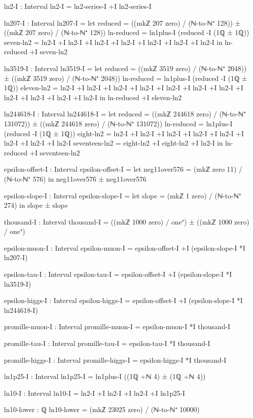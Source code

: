 \documentclass[11pt,a4paper]{book}
\begin{document}
\begin{code}
ln2-I : Interval
ln2-I = ln2-series-I +I ln2-series-I

ln207-I : Interval
ln207-I = 
  let reduced = ((mkℤ 207 zero) / (ℕ-to-ℕ⁺ 128)) ± ((mkℤ 207 zero) / (ℕ-to-ℕ⁺ 128))
      ln-reduced = ln1plus-I (reduced -I (1ℚ ± 1ℚ))
      seven-ln2 = ln2-I +I ln2-I +I ln2-I +I ln2-I +I ln2-I +I ln2-I +I ln2-I
  in ln-reduced +I seven-ln2

ln3519-I : Interval
ln3519-I = 
  let reduced = ((mkℤ 3519 zero) / (ℕ-to-ℕ⁺ 2048)) ± ((mkℤ 3519 zero) / (ℕ-to-ℕ⁺ 2048))
      ln-reduced = ln1plus-I (reduced -I (1ℚ ± 1ℚ))
      eleven-ln2 = ln2-I +I ln2-I +I ln2-I +I ln2-I +I ln2-I +I ln2-I +I ln2-I +I ln2-I +I ln2-I +I ln2-I +I ln2-I
  in ln-reduced +I eleven-ln2

ln244618-I : Interval
ln244618-I = 
  let reduced = ((mkℤ 244618 zero) / (ℕ-to-ℕ⁺ 131072)) ± ((mkℤ 244618 zero) / (ℕ-to-ℕ⁺ 131072))
      ln-reduced = ln1plus-I (reduced -I (1ℚ ± 1ℚ))
      eight-ln2 = ln2-I +I ln2-I +I ln2-I +I ln2-I +I ln2-I +I ln2-I +I ln2-I +I ln2-I
      seventeen-ln2 = eight-ln2 +I eight-ln2 +I ln2-I
  in ln-reduced +I seventeen-ln2

epsilon-offset-I : Interval
epsilon-offset-I = 
  let neg11over576 = (mkℤ zero 11) / (ℕ-to-ℕ⁺ 576)
  in neg11over576 ± neg11over576

epsilon-slope-I : Interval  
epsilon-slope-I = 
  let slope = (mkℤ 1 zero) / (ℕ-to-ℕ⁺ 274)
  in slope ± slope

thousand-I : Interval
thousand-I = ((mkℤ 1000 zero) / one⁺) ± ((mkℤ 1000 zero) / one⁺)

epsilon-muon-I : Interval
epsilon-muon-I = epsilon-offset-I +I (epsilon-slope-I *I ln207-I)

epsilon-tau-I : Interval
epsilon-tau-I = epsilon-offset-I +I (epsilon-slope-I *I ln3519-I)

epsilon-higgs-I : Interval
epsilon-higgs-I = epsilon-offset-I +I (epsilon-slope-I *I ln244618-I)

promille-muon-I : Interval
promille-muon-I = epsilon-muon-I *I thousand-I

promille-tau-I : Interval
promille-tau-I = epsilon-tau-I *I thousand-I

promille-higgs-I : Interval
promille-higgs-I = epsilon-higgs-I *I thousand-I

ln1p25-I : Interval
ln1p25-I = ln1plus-I ((1ℚ ÷ℕ 4) ± (1ℚ ÷ℕ 4))

ln10-I : Interval
ln10-I = ln2-I +I ln2-I +I ln2-I +I ln1p25-I

ln10-lower : ℚ
ln10-lower = (mkℤ 23025 zero) / (ℕ-to-ℕ⁺ 10000)


\end{code}
\end{document}

